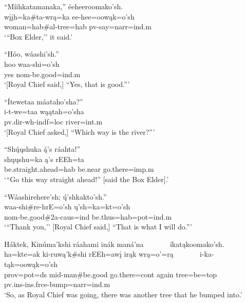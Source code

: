 \begin{exe}
\item\label{EJ86} \glll ``Míihkatamanaka,'' éeheeroomako'sh.\\
wįįh=ka\#ta-wrą=ka ee-hee=oowąk=o'sh\\
\textnormal{woman}=hab\#al-\textnormal{tree}=hab pv-\textnormal{say}=narr=ind.m\\
\glt `{``}Box Elder,'' it said.'

\item\label{EJ87} \glll ``Hóo, wáashi'sh.''\\
hoo waa-shi=o'sh\\
\textnormal{yes} nom-\textnormal{be.good}=ind.m\\
\glt `[Royal Chief said,] ``Yes, that is good.{''}'

\item\label{EJ88} \glll ``Ítewetaa máataho'sha?''\\
i-t-we=taa wąątah=o'sha\\
pv.dir-wh-indf=loc \textnormal{river}=int.m\\
\glt `[Royal Chief asked,] ``Which way is the river?{''}'

\item\label{EJ89} \glll ``Shų́ųshuka ą́'s ráahta!''\\
shųųshu=ka ą's rEEh=ta\\
\textnormal{be.straight.ahead}=hab \textnormal{be.near} \textnormal{go.there}=imp.m\\
\glt `{``}Go this way straight ahead!{''} [said the Box Elder].'

\item\label{EJ90} \glll ``Wáashirehere'sh; ų́'shkakto'sh.''\\
waa-shi\#re-hrE=o'sh ų'sh=ka=kt=o'sh\\
nom-\textnormal{be.good}\#2a-caus=ind \textnormal{be.thus}=hab=pot=ind.m\\
\glt `{``}Thank you,'' [Royal Chief said,] ``That is what I will do.{''}'

\item\label{EJ91} \glll Háktek, Kinúma'kshi ráahami inák maná'na ~ ~ ~ ~ íkatąkoomako'sh.\\
ha=kte=ak ki-ruwą'k\#shi rEEh=awį irąk wrą=o'=rą ~ ~ ~ ~ i-ka-tąk=oowąk=o'sh\\
prov=pot=ds mid-\textnormal{man}\#\textnormal{be.good} \textnormal{go.there}=cont \textnormal{again} \textnormal{tree}=\textnormal{be}=top ~ ~ ~ ~ pv.ins-ins.frce-\textnormal{bump}=narr=ind.m\\
\glt `So, as Royal Chief was going, there was another tree that he bumped into.'


\end{exe}
